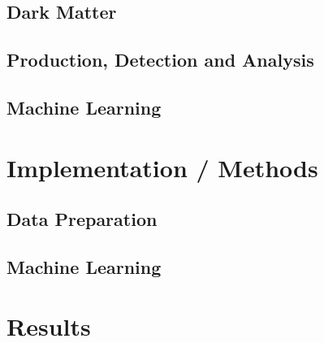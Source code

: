 \documentclass[14pt, a4paper]{book}
\begin{document}
\chapter{Dark Matter}\label{chap:DM}


\chapter{Production, Detection and Analysis}\label{chap:CERN_method}


\chapter{Machine Learning}



\part{Implementation / Methods}


\chapter{Data Preparation}\label{chap:data_prep}


\chapter{Machine Learning}\label{chap:ML}


\part{Results}

\graphicspath{{figures/}}
\end{document}
